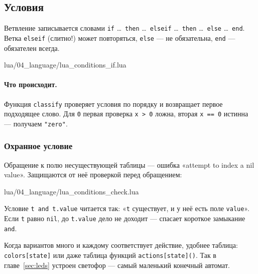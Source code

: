 \subsection{Условия}

Ветвление записывается словами \texttt{if} \dots\ \texttt{then} \dots\ \texttt{elseif} \dots\ \texttt{then} \dots\ \texttt{else} \dots\ \texttt{end}. Ветка \verb|elseif| (слитно!) может повторяться, \verb|else| --- не обязательна, \verb|end| --- обязателен всегда.

\begin{codefile}{lua/04_language/lua_conditions_if.lua}
\end{codefile}

\paragraph{Что происходит.} Функция \verb|classify| проверяет условия по порядку и возвращает первое подходящее слово. Для \verb|0| первая проверка \verb|x > 0| ложна, вторая \verb|x == 0| истинна --- получаем \verb|"zero"|.

\subsubsection*{Охранное условие}

Обращение к полю несуществующей таблицы --- ошибка «attempt to index a nil value». Защищаются от неё проверкой перед обращением:

\begin{codefile}{lua/04_language/lua_conditions_check.lua}
\end{codefile}

Условие \verb|t and t.value| читается так: «\verb|t| существует, и у неё есть поле \verb|value|». Если \verb|t| равно \verb|nil|, до \verb|t.value| дело не доходит --- спасает короткое замыкание \verb|and|.

\begin{hintbox}
Когда вариантов много и каждому соответствует действие, удобнее таблица: \verb|colors[state]| или даже таблица функций \verb|actions[state]()|. Так в главе~\ref{sec:leds} устроен светофор --- самый маленький конечный автомат.
\end{hintbox}

